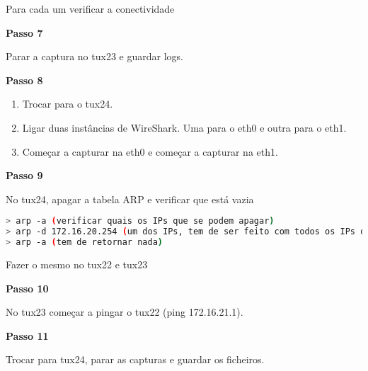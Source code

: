 Para cada um verificar a conectividade

\textbf{Passo 7}

Parar a captura no tux23 e guardar logs.

\textbf{Passo 8}

\begin{enumerate}
  \item Trocar para o tux24.
  \item Ligar duas instâncias de WireShark. Uma para o eth0 e outra para o eth1. 
  \item Começar a capturar na eth0 e começar a capturar na eth1.
\end{enumerate}

\textbf{Passo 9}

No tux24, apagar a tabela ARP e verificar que está vazia
\begin{lstlisting}[language=bash]
> arp -a (verificar quais os IPs que se podem apagar)
> arp -d 172.16.20.254 (um dos IPs, tem de ser feito com todos os IPs de cima)
> arp -a (tem de retornar nada)
\end{lstlisting}
Fazer o mesmo no tux22 e tux23

\textbf{Passo 10}

No tux23 começar a pingar o tux22 (ping 172.16.21.1).

\textbf{Passo 11}

Trocar para tux24, parar as capturas e guardar os ficheiros.